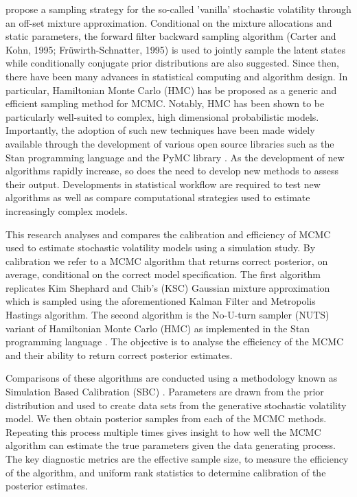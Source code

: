 \documentclass[12pt, a4paper]{article}
\begin{document}
    \citet{kim1998stochastic} propose a sampling strategy for the so-called 'vanilla' stochastic volatility through an off-set mixture approximation. Conditional on the mixture allocations and static parameters, the forward filter backward sampling algorithm (Carter and Kohn, 1995; Fr{\"u}wirth-Schnatter, 1995) is used to jointly sample the latent states while conditionally  conjugate prior distributions are also suggested.  Since then, there have been many advances in statistical computing and algorithm design. In particular, Hamiltonian Monte Carlo (HMC) has be proposed as a generic and efficient sampling method for MCMC. Notably, HMC has been shown to be particularly well-suited to complex, high dimensional probabilistic models. Importantly, the adoption of such new techniques have been made widely available through the development of various open source libraries such as the Stan programming language \citep{stan} and the PyMC library \citep{pymc2023}. As the development of new algorithms rapidly increase, so does the need to develop new methods to assess their output. Developments in statistical workflow are required to test new algorithms as well as compare computational strategies used to estimate increasingly complex models.

    This research analyses and compares the calibration and efficiency of MCMC used to estimate stochastic volatility models using a simulation study. By calibration we refer to a MCMC algorithm that returns correct posterior, on average, conditional on the correct model specification. The first algorithm replicates Kim Shephard and Chib's (KSC) Gaussian mixture approximation which is sampled using the aforementioned Kalman Filter and Metropolis Hastings algorithm. The second algorithm is the No-U-turn sampler (NUTS) variant of Hamiltonian Monte Carlo (HMC) as implemented in the Stan programming language \citep{hoffman2014no, betancourt2017conceptual, stan}. The objective is to analyse the efficiency of the MCMC and their ability to return correct posterior estimates.

    Comparisons of these algorithms are conducted using a methodology known as Simulation Based Calibration (SBC) \citep{talts2018validating}. Parameters are drawn from the prior distribution and used to create data sets from the generative stochastic volatility model. We then obtain posterior samples from each of the MCMC methods. Repeating this process multiple times gives insight to how well the MCMC algorithm can estimate the true parameters given the data generating process. The key diagnostic metrics are the effective sample size, to measure the efficiency of the algorithm, and uniform rank statistics to determine calibration of the posterior estimates. 
\end{document}
